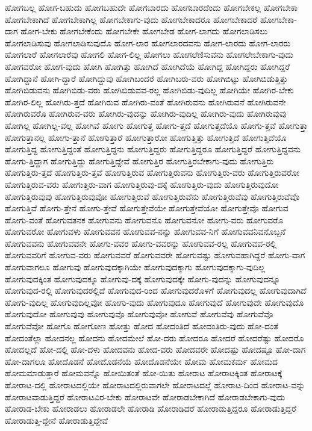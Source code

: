{ಹೋಗಬಲ್ಲ
ಹೋಗ-ಬಹುದು
ಹೋಗಬಹುದೇ
ಹೋಗಬಾರದು
ಹೋಗಬಾರದೆಂದು
ಹೋಗಬೇಕಲ್ಲ
ಹೋಗಬೇಕಾ
ಹೋಗಬೇಕಾಗಿದೆ
ಹೋಗಬೇಕಾಗಿಲ್ಲ
ಹೋಗಬೇಕಾಗು-ವುದು
ಹೋಗಬೇಕಾದರೂ
ಹೋಗಬೇಕಾದರೆ
ಹೋಗಬೇಕಾ-ದಾಗ
ಹೋಗ-ಬೇಕು
ಹೋಗಬೇಕೆಂದು
ಹೋಗಬೇಕೇ
ಹೋಗಬೇಡ
ಹೋಗ-ಲಾಗದು
ಹೋಗಲಾಡಿಸಲು
ಹೋಗಲಾಡಿಸುವು
ಹೋಗಲಾಡಿಸುವುದೊ
ಹೋಗ-ಲಾರ
ಹೋಗಲಾರದವನು
ಹೋಗ-ಲಾರದು
ಹೋಗ-ಲಾರರು
ಹೋಗಲಾರೆ
ಹೋಗಲಾರೆವು
ಹೋಗಲಿ
ಹೋಗ-ಲಿಲ್ಲ
ಹೋಗಲು
ಹೋಗಲೆಣಿಸುವನು
ಹೋಗಲೇಬೇಕಾಗು-ವುದು
ಹೋಗವರೋ
ಹೋಗ-ವುದು
ಹೋಗಿ
ಹೋಗಿತ್ತು
ಹೋಗಿದೆ
ಹೋಗಿದೆಯೆ
ಹೋಗಿದ್ದ
ಹೋಗಿದ್ದರು
ಹೋಗಿದ್ದರೆ
ಹೋಗಿದ್ದಾನೆ
ಹೋಗಿ-ದ್ದಾರೆ
ಹೋಗಿದ್ದುವು
ಹೋಗಿಬಂದರೆ
ಹೋಗಿಬರು-ವರು
ಹೋಗಿಬಿಟ್ಟು
ಹೋಗಿಬಿಡುತ್ತಿತ್ತು
ಹೋಗಿಬಿಡುವನು
ಹೋಗಿಬಿಡು-ವರು
ಹೋಗಿಬಿಡುವವ-ರಲ್ಲ
ಹೋಗಿಬಿಡು-ವುದಿಲ್ಲ
ಹೋಗಿಯೇ
ಹೋಗಿರ-ಬೇಕು
ಹೋಗಿರ-ಲಿಲ್ಲ
ಹೋಗಿರು-ತ್ತದೆ
ಹೋಗಿರುವ
ಹೋಗಿರು-ವಂತೆ
ಹೋಗಿರುವನು
ಹೋಗಿರುವನೆ
ಹೋಗಿರುವನೇ
ಹೋಗಿರುವರೊ
ಹೋಗಿರುವ-ವರು
ಹೋಗಿರು-ವುದನ್ನು
ಹೋಗಿರು-ವುದಿಲ್ಲ
ಹೋಗಿರು-ವುದು
ಹೋಗಿರುವುವು
ಹೋಗಿಲ್ಲ
ಹೋಗಿಲ್ಲ-ವಲ್ಲ
ಹೋಗಿವೆ
ಹೋಗು
ಹೋಗುತ್ತ
ಹೋಗು-ತ್ತದೆ
ಹೋಗುತ್ತದೆಯೊ
ಹೋಗು-ತ್ತವೆ
ಹೋಗುತ್ತಾ
ಹೋಗುತ್ತಾನಲ್ಲ
ಹೋಗು-ತ್ತಾನೆ
ಹೋಗುತ್ತಾರೆ
ಹೋಗುತ್ತಾರೋ
ಹೋಗುತ್ತಿತ್ತು
ಹೋಗುತ್ತಿದೆ
ಹೋಗುತ್ತಿದೆಯೊ
ಹೋಗುತ್ತಿದ್ದ
ಹೋಗುತ್ತಿದ್ದಂತೆ
ಹೋಗುತ್ತಿದ್ದನು
ಹೋಗುತ್ತಿದ್ದರು
ಹೋಗುತ್ತಿದ್ದರೂ
ಹೋಗುತ್ತಿದ್ದರೆ
ಹೋಗುತ್ತಿದ್ದವನು
ಹೋಗು-ತ್ತಿದ್ದಾಗ
ಹೋಗುತ್ತಿದ್ದು
ಹೋಗುತ್ತಿದ್ದೇವೆ
ಹೋಗುತ್ತಿರ
ಹೋಗುತ್ತಿರಬೇಕಾಗು-ವುದು
ಹೋಗುತ್ತಿರು
ಹೋಗುತ್ತಿರು-ತ್ತದೆ
ಹೋಗುತ್ತಿರು-ತ್ತವೆ
ಹೋಗುತ್ತಿರುವ
ಹೋಗುತ್ತಿರುವನು
ಹೋಗುತ್ತಿರು-ವರು
ಹೋಗುತ್ತಿರುವರೋ
ಹೋಗುತ್ತಿರುವ-ವರು
ಹೋಗುತ್ತಿರು-ವಾಗ
ಹೋಗುತ್ತಿರುವು-ದಕ್ಕೆ
ಹೋಗುತ್ತಿರು-ವುದು
ಹೋಗುತ್ತಿರುವುದೋ
ಹೋಗುತ್ತಿರುವುವು
ಹೋಗುತ್ತಿರುವುವೋ
ಹೋಗುತ್ತಿರುವೆ
ಹೋಗುತ್ತಿರುವೆನು
ಹೋಗುತ್ತಿರುವೆವು
ಹೋಗುತ್ತಿರುವೆವೊ
ಹೋಗುತ್ತಿವೆ
ಹೋಗು-ತ್ತೇನೆ
ಹೋಗು-ತ್ತೇವೆ
ಹೋಗುತ್ತೇವೆಯೇ
ಹೋಗುತ್ತೇವೆಯೋ
ಹೋಗುತ್ತೇವೊ
ಹೋಗುವ
ಹೋಗು-ವಂತೆ
ಹೋಗುವತನಕ
ಹೋಗುವನು
ಹೋಗುವನೊ
ಹೋಗುವನೋ
ಹೋಗು-ವರು
ಹೋಗುವರೊ
ಹೋಗುವರೋ
ಹೋಗುವಳು
ಹೋಗುವವನ
ಹೋಗುವವ-ನನ್ನು
ಹೋಗುವವ-ನಿಗೆ
ಹೋಗುವವನಿವನೊಬ್ಬನೆ
ಹೋಗುವವನು
ಹೋಗುವವನೇ
ಹೋಗು-ವವರ
ಹೋಗು-ವವರನ್ನು
ಹೋಗುವವ-ರಲ್ಲ
ಹೋಗುವವ-ರಲ್ಲಿ
ಹೋಗುವವರಿಗೆ
ಹೋಗುವ-ವರು
ಹೋಗುವವರೆ
ಹೋಗುವವರೇ
ಹೋಗುವಷ್ಟು
ಹೋಗುವಹಾಗಿದ್ದರೆ
ಹೋಗು-ವಾಗ
ಹೋಗುವಾಗಲೂ
ಹೋಗುವು
ಹೋಗುವುದಕ್ಕಾಗಿಯೇ
ಹೋಗುವುದಕ್ಕಾಗು
ಹೋಗುವುದಕ್ಕಾಗು-ವುದಿಲ್ಲ
ಹೋಗುವುದಕ್ಕಿಂತ
ಹೋಗುವುದಕ್ಕೂ
ಹೋಗುವು-ದಕ್ಕೆ
ಹೋಗುವುದಕ್ಕೇ
ಹೋಗು-ವುದನ್ನು
ಹೋಗುವುದನ್ನೂ
ಹೋಗುವುದ-ರಲ್ಲಿ
ಹೋಗುವುದರಲ್ಲಿದೆ
ಹೋಗುವುದ-ರಿಂದ
ಹೋಗುವುದರೊಳಗೆ
ಹೋಗುವುದಲ್ಲ
ಹೋಗುವುದಾಗಿದೆ
ಹೋಗು-ವುದಿಲ್ಲ
ಹೋಗುವುದಿಲ್ಲವೋ
ಹೋಗು-ವುದು
ಹೋಗುವುದೂ
ಹೋಗುವುದೆ
ಹೋಗುವುದೇ
ಹೋಗುವುದೊ
ಹೋಗುವುದೋ
ಹೋಗುವುವು
ಹೋಗುವುವೊ
ಹೋಗುವುವೋ
ಹೋಗುವೆ
ಹೋಗುವೆವು
ಹೋಗುವೆವೊ
ಹೋಗುವೆವೋ
ಹೋಗೊ
ಹೋಗೋಣ
ಹೋತ್ತು
ಹೋದ
ಹೋದಂತಿದೆ
ಹೋದಂತಿರು-ವುದು
ಹೋ-ದಂತೆ
ಹೋದಂತೆಲ್ಲಾ
ಹೋದನಲ್ಲ
ಹೋದನು
ಹೋದಮೇಲೆ
ಹೋ-ದರು
ಹೋದರೂ
ಹೋದರೆ
ಹೋದರೆಷ್ಟು
ಹೋದರೊ
ಹೋದಲ್ಲದೆ
ಹೋ-ದಲ್ಲಿ
ಹೋ-ದಳು
ಹೋದವನು
ಹೋದ-ವರು
ಹೋದವರೇ
ಹೋದಷ್ಟು
ಹೋದಷ್ಟೂ
ಹೋ-ದಾಗ
ಹೋ-ದಾಗಲೂ
ಹೋದೊಡನೆ
ಹೋದೊಡನೆಯೆ
ಹೋದೊಡನೆಯೇ
ಹೋಮ
ಹೋಮಕರ್ಮ
ಹೋಮದ
ಹೋಮಮಾಡುತ್ತಾರೆ
ಹೋಮವನ್ನೊ
ಹೋಯಿತಂತೆ
ಹೋ-ಯಿತು
ಹೋರಾಟ
ಹೋರಾಟಕ್ಕಿಂತ
ಹೋರಾಟಕ್ಕೆ
ಹೋರಾಟ-ದಲ್ಲಿ
ಹೋರಾಟದಲ್ಲಿಯೇ
ಹೋರಾಟದಲ್ಲಿರುವಾಗಲೇ
ಹೋರಾಟದಲ್ಲೆ
ಹೋರಾಟ-ದಿಂದ
ಹೋರಾಟ-ವನ್ನು
ಹೋರಾಟವಾಡುತ್ತಿದ್ದರೆ
ಹೋರಾಟವಿರ-ಬೇಕು
ಹೋರಾಟವೇ
ಹೋರಾಡಬೇಕಾಗಿದೆ
ಹೋರಾಡಬೇಕಾಗು-ವುದು
ಹೋರಾಡ-ಬೇಕು
ಹೋರಾಡಲು
ಹೋರಾಡಲೇ
ಹೋರಾಡಿ
ಹೋರಾಡಿದರೆ
ಹೋರಾಡುತ್ತಿದ್ದರೂ
ಹೋರಾಡುತ್ತಿದ್ದರೆ
ಹೋರಾಡುತ್ತಿ-ದ್ದೇನೆ
ಹೋರಾಡುತ್ತಿದ್ದೇವೆ
}
